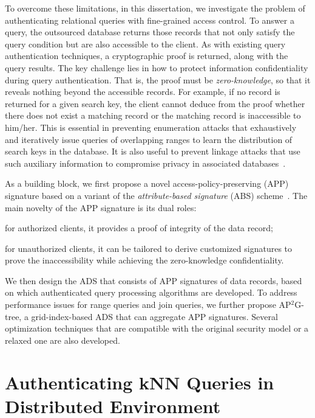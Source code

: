 To overcome these limitations, in this dissertation, we investigate the problem of authenticating relational queries with fine-grained access control. To answer a query, the outsourced database returns those records that not only satisfy the query condition but  are also accessible to the client. As with existing query authentication techniques, a cryptographic proof is returned, along with the query results. The key challenge lies in how to protect information confidentiality during query authentication. That is, the proof must be \emph{zero-knowledge}, so that it reveals nothing beyond the accessible records. For example, if no record is returned for a given search key, the client cannot deduce from the proof whether there does not exist a matching record or the matching record is inaccessible to him/her. This is essential in preventing enumeration attacks that exhaustively and iteratively issue queries of overlapping ranges to learn the distribution of search keys in the database. It is also useful to prevent linkage attacks that use such auxiliary information to compromise privacy in associated databases~\cite{10.1145/1749603.1749605}.

As a building block, we first propose a novel access-policy-preserving (APP) signature based on a variant of the \emph{attribute-based signature} (ABS) scheme~\cite{10.1007/978-3-642-19074-2_24}. The main novelty of the APP signature is its dual roles:
\begin{inlineenum}
  \item for authorized clients, it provides a proof of integrity of the data record;
  \item for unauthorized clients, it can be tailored to derive customized signatures to prove the inaccessibility while achieving the zero-knowledge confidentiality.
\end{inlineenum}
We then design the ADS that consists of APP signatures of data records, based on which authenticated query processing algorithms are developed. To address performance issues for range queries and join queries, we further propose AP$^2$G-tree, a grid-index-based ADS that can aggregate APP signatures. Several optimization techniques that are compatible with the original security model or a relaxed one are also developed.

\section{Authenticating {kNN} Queries in Distributed Environment}

